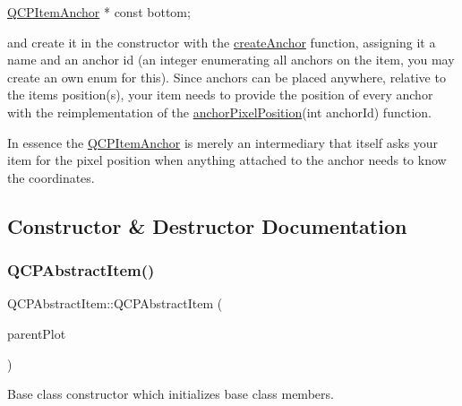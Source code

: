 \begin{DoxyCode}
\hyperlink{class_q_c_p_item_anchor}{QCPItemAnchor} * \textcolor{keyword}{const} bottom;
\end{DoxyCode}


and create it in the constructor with the \hyperlink{class_q_c_p_abstract_item_af3fc92527802078ca395138748b629a7}{create\+Anchor} function, assigning it a name and an anchor id (an integer enumerating all anchors on the item, you may create an own enum for this). Since anchors can be placed anywhere, relative to the item\textquotesingle{}s position(s), your item needs to provide the position of every anchor with the reimplementation of the \hyperlink{class_q_c_p_abstract_item_ada5bad4e1196c4fc0d0d12328e24b8f2}{anchor\+Pixel\+Position}(int anchor\+Id) function.

In essence the \hyperlink{class_q_c_p_item_anchor}{Q\+C\+P\+Item\+Anchor} is merely an intermediary that itself asks your item for the pixel position when anything attached to the anchor needs to know the coordinates. 

\subsection{Constructor \& Destructor Documentation}
\mbox{\label{class_q_c_p_abstract_item_a9922507d8b4503a1fe1ed0b1030e23b6}} 
\subsubsection{\texorpdfstring{Q\+C\+P\+Abstract\+Item()}{QCPAbstractItem()}}
{\footnotesize\ttfamily Q\+C\+P\+Abstract\+Item\+::\+Q\+C\+P\+Abstract\+Item (\begin{DoxyParamCaption}\item[{\hyperlink{class_q_custom_plot}{Q\+Custom\+Plot} $\ast$}]{parent\+Plot }\end{DoxyParamCaption})\hspace{0.3cm}{\ttfamily [explicit]}}

Base class constructor which initializes base class members. \mbox{\label{class_q_c_p_abstract_item_a375bd1b7d3218b04a6ff7ff06fff917c}} 
